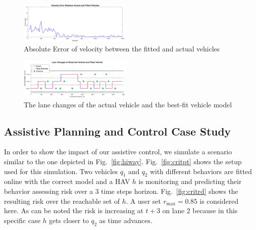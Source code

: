 \documentclass[letterpaper, 10 pt, conference]{ieeeconf}  %
\begin{document}

\begin{figure}[ht]
    \includegraphics[width=0.48\textwidth]{fig/fiterroravg.png}
    \vspace{-5pt}
    \caption{Absolute Error of velocity between the fitted and actual vehicles} \label{fig:fwd}
\end{figure}
 \vspace{-10pt}
\begin{figure}[ht]
    \includegraphics[width=0.48\textwidth]{fig/lanefit.png}
     \vspace{-5pt}
    \caption{The lane changes of the actual vehicle and the best-fit vehicle model} \label{fig:lanchan}
\end{figure}


\subsection{Assistive Planning and Control Case Study}
In order to show the impact of our assistive control, we simulate a scenario similar to the one depicted in Fig.~\ref{fig:hiway}. 
Fig.~\ref{fig:critpt} shows the setup used for this simulation. Two vehicles $q_1$ and $q_2$ with different behaviors are fitted online with the correct model and a HAV $h$ is monitoring and predicting their behavior assessing risk over a 3 time steps horizon. 
Fig.~\ref{fig:critrd} shows the resulting risk over the reachable set of $h$. A user set $r_{\max} = 0.85$ is considered here. As can be noted the risk is increasing at $t+3$ on lane 2 because in this specific case $h$ gets closer to $q_2$ as time advances. 
\end{document}
